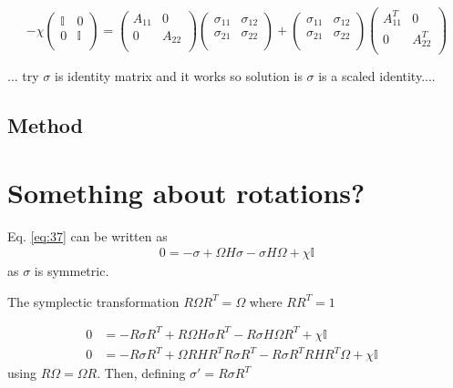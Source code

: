 \documentclass[11pt,a4paper]{article}
\numberwithin{equation}{section}
\begin{document}
	\begin{equation*}
	 -\chi \begin{pmatrix}
	\mathbb{I} & 0  \\
	0 & \mathbb{I}\\
	\end{pmatrix} = \begin{pmatrix}
	A_{11} & 0  \\
	0 & A_{22}\\
	\end{pmatrix}\begin{pmatrix}
	\sigma_{11} & \sigma_{12}  \\
	\sigma_{21} & \sigma_{22}\\
	\end{pmatrix} + \begin{pmatrix}
	\sigma_{11} & \sigma_{12}  \\
	\sigma_{21} & \sigma_{22}\\
	\end{pmatrix}\begin{pmatrix}
	A_{11}^T & 0  \\
	0 & A_{22}^T\\
	\end{pmatrix}
	\end{equation*}
	
	... try $\sigma$ is identity matrix and it works so solution is $\sigma$ is a scaled identity.... 
	
	\color{red}\subsection{Method}\color{black}
	
 	\iffalse
	\section{Something about rotations?}
	 
	Eq. \ref{eq:37} can be written as
	\begin{align*} 
	0 = -\sigma + \Omega H\sigma -\sigma H\Omega + \chi \mathbb{I} 
	\end{align*} as $\sigma$ is symmetric. 
	
	The symplectic transformation $R\Omega R^{T} = \Omega$ where $RR^{T}=1$

	\begin{align*} 
	0 &= -R\sigma R^{T} + R\Omega H\sigma R^{T} - R\sigma H\Omega R^{T} + \chi \mathbb{I}&\\
	0 &= -R\sigma R^{T} + \Omega R H R^T R \sigma R^{T} - R\sigma R^{T} RH R^T\Omega + \chi \mathbb{I}& 
	\end{align*}	using $R\Omega = \Omega R$. Then, defining $\sigma' = R\sigma R^T$
	
\end{document}
